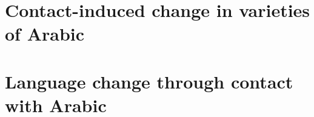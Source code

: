 \documentclass[output=book,modfonts,nonflat,collection,collectionchapter,%
		,%
	    ,multiauthors
        ,nobabel
        ,arseneau
		  ]{langsci/langscibook}
\begin{document}
\maketitle
\frontmatter

\tableofcontents
\mainmatter








\part{Contact-induced change in varieties of Arabic}


 \part{Language change through contact with Arabic}
\end{document}
